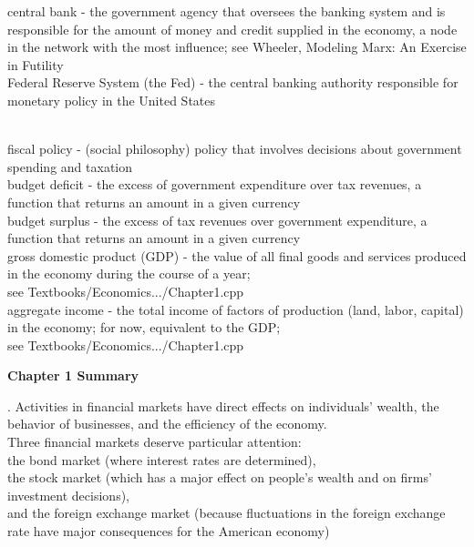 \documentclass[12pt]{article}
\begin{document}
\noindent central bank -  the government agency that oversees the banking system and is responsible for the amount of money and credit supplied in the economy, a node in the network with the most influence; see Wheeler, Modeling Marx: An Exercise in Futility\\

\noindent Federal Reserve System (the Fed) - the central banking authority responsible for monetary policy in the United States\\

\newpage

\\

\noindent fiscal policy - (social philosophy) policy that involves decisions about government spending and taxation\\

\noindent budget deficit - the excess of government expenditure over tax revenues, a function that returns an amount in a given currency\\

\noindent budget surplus - the excess of tax revenues over government expenditure, a function that returns an amount in a given currency\\

\noindent gross domestic product (GDP) -  the value of all final goods and services produced in the economy during the course of a year; \\
\noindent see Textbooks/Economics.../Chapter1.cpp\\

\noindent aggregate income - the total income of factors of production (land, labor, capital) in the economy; for now, equivalent to the GDP;\\
\noindent see Textbooks/Economics.../Chapter1.cpp\\

\newpage 

\begin{center}
\large {\bf Chapter 1 Summary}
\end{center}

. Activities in financial markets have direct effects on individuals' wealth, the behavior of businesses, and the efficiency of the economy.\\
Three financial markets deserve particular attention: \\
the bond market (where interest rates are determined),\\
the stock market (which has a major effect on people's wealth and on firms' investment decisions),\\
and the foreign exchange market (because fluctuations in the foreign exchange rate have major consequences for the American economy)\\
\end{document}
